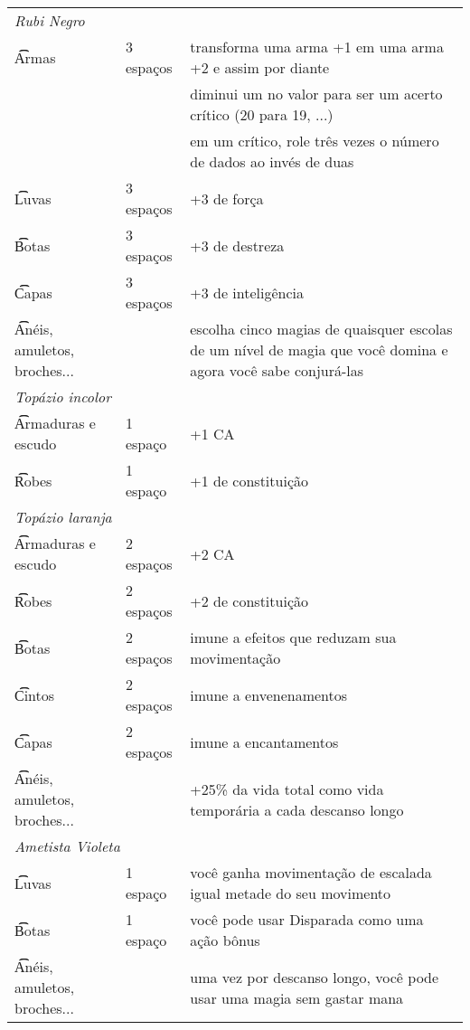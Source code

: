 \begin{center}
\begin{longtable}{ m{6cm} m{2cm} m{8cm} }
    \multicolumn{2}{l}{\t\textit{Rubi Negro}} \\
    \t\t Armas & 3 espaços & transforma uma arma +1 em uma arma +2 e assim por
    diante\\&& diminui um no valor para ser um acerto crítico (20 para 19, ...)
    \\&&em um crítico, role três vezes o número de dados ao invés de duas\\
    \hline
    \t\t Luvas & 3 espaços & +3 de força \\ \hline
    \t\t Botas & 3 espaços & +3 de destreza \\ \hline
    \t\t Capas & 3 espaços & +3 de inteligência \\ \hline
    \t\t Anéis, amuletos, broches... && escolha cinco magias de quaisquer
    escolas de um nível de magia que você domina e agora você sabe
    conjurá-las \\

    \hline \hline \hline \hline

    \multicolumn{2}{l}{\t\textit{Topázio incolor}} \\
    \t\t Armaduras e escudo & 1 espaço & +1 CA \\ \hline
    \t\t Robes & 1 espaço & +1 de constituição \\
    \hline \hline

    \multicolumn{2}{l}{\t\textit{Topázio laranja}} \\
    \t\t Armaduras e escudo & 2 espaços & +2 CA \\ \hline
    \t\t Robes & 2 espaços & +2 de constituição \\ \hline
    \t\t Botas & 2 espaços & imune a efeitos que reduzam sua movimentação \\ \hline
    \t\t Cintos & 2 espaços & imune a envenenamentos \\ \hline
    \t\t Capas & 2 espaços & imune a encantamentos \\ \hline
    \t\t Anéis, amuletos, broches... && +25\% da vida total como vida temporária
    a cada descanso longo \\
    \hline \hline

    \hline \hline \hline \hline

    \multicolumn{2}{l}{\t\textit{Ametista Violeta}} \\
    \t\t Luvas & 1 espaço & você ganha movimentação de escalada igual
    metade do seu movimento \\ \hline
    \t\t Botas & 1 espaço & você pode usar Disparada como uma ação bônus \\
    \hline
    \t\t Anéis, amuletos, broches... && uma vez por descanso longo,
    você pode usar uma magia sem gastar mana \\
    \hline \hline


\end{longtable}
\end{center}

